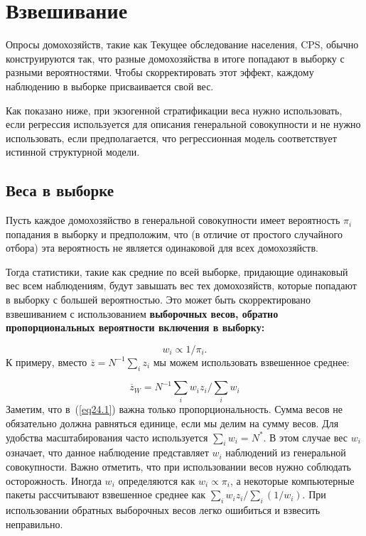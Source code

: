 \section{Взвешивание}

Опросы домохозяйств, такие как Текущее обследование населения, CPS, обычно конструируются так, что разные домохозяйства в итоге попадают в выборку с разными вероятностями. Чтобы скорректировать этот эффект, каждому наблюдению в выборке присваивается свой вес. 

Как показано ниже, при экзогенной стратификации веса нужно использовать, если регрессия используется для описания генеральной совокупности и не нужно использовать, если предполагается, что регрессионная модель соответствует истинной структурной модели. 

\subsection{Веса в выборке}

Пусть каждое домохозяйство в генеральной совокупности имеет вероятность $\pi_i$ попадания в выборку и предположим, что (в отличие от простого случайного отбора) эта вероятность не является одинаковой для всех домохозяйств. 

Тогда статистики, такие как средние по всей выборке, придающие одинаковый вес всем наблюдениям, будут завышать вес тех домохозяйств, которые попадают в выборку с большей вероятностью. Это может быть скорректировано взвешиванием с использованием \bfseries выборочных весов\mdseries, обратно пропорциональных вероятности включения в выборку:

\begin{equation}
\label{eq24.1}
w_i \propto 1/\pi_i.
\end{equation}
К примеру, вместо $\overline{z} = N^{-1} \sum_i z_i$ мы можем использовать взвешенное среднее:

$$\overline{z}_W = N^{-1} \sum_i w_iz_i/\sum_iw_i$$
Заметим, что в~(\ref{eq24.1}) важна только пропорциональность. Сумма весов не обязательно должна равняться единице, если мы делим на сумму весов. Для удобства масштабирования часто используется $\sum_iw_i = N^*$. В этом случае вес $w_i$ означает, что данное наблюдение представляет $w_i$ наблюдений из генеральной совокупности. Важно отметить, что при использовании весов нужно соблюдать осторожность. Иногда $w_i$  определяются как $w_i \propto \pi_i$, а некоторые компьютерные пакеты рассчитывают взвешенное среднее как $\sum_i w_iz_i/\sum_i(1/w_i)$. При использовании обратных выборочных весов легко ошибиться и взвесить неправильно. 

